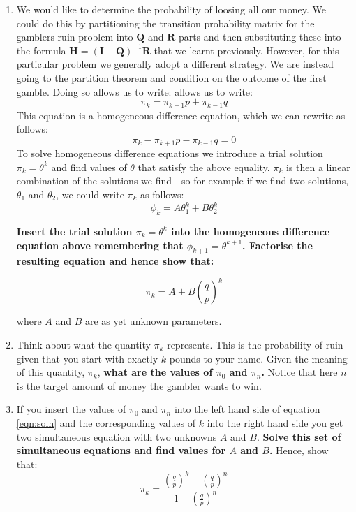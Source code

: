 \documentclass[a4paper]{article}
\begin{document}
\begin{enumerate}
\item We would like to determine the probability of loosing all our money.  We could do this by partitioning the transition probability matrix for the gamblers ruin problem into $\mathbf{Q}$ and
$\mathbf{R}$ parts and then substituting these into the formula $\mathbf{H} = (\mathbf{I} - \mathbf{Q})^{-1} \mathbf{R}$ that we learnt previously.  However, for this particular problem we generally
adopt a different strategy.  We are instead going to the partition theorem and condition on the outcome of the first gamble.  Doing so allows us to write:
allows us to write:
\[
 \pi_k = \pi_{k+1}p + \pi_{k-1}q
\]
This equation is a homogeneous difference equation, which we can rewrite as follows:
\[
\pi_k - \pi_{k+1}p - \pi_{k-1}q = 0
\]
To solve homogeneous difference equations we introduce a trial solution $\pi_k = \theta^k$ and find values of $\theta$ that satisfy the above equality.  $\pi_k$ is then a linear combination of the
solutions we find - so for example if we find two solutions, $\theta_1$ and $\theta_2$, we could write $\pi_k$ as follows:
\[
 \phi_k = A \theta_1^k + B \theta_2^k
\]
{\bf Insert the trial solution $\pi_k = \theta^k$ into the homogeneous difference equation above remembering that $\phi_{k+1}=\theta^{k+1}$.  Factorise the resulting equation and hence show that:

\begin{equation}
 \pi_k = A + B \left( \frac{q}{p}\right)^k
\label{eqn:soln}
\end{equation}

where $A$ and $B$ are as yet unknown parameters.}

\item Think about what the quantity $\pi_k$ represents.  This is the probability of ruin given that you start with exactly $k$ pounds to your name.  Given the meaning of this quantity, $\pi_k$, {\bf
what are the values of $\pi_0$ and $\pi_n$.}  Notice that here $n$ is the target amount of money the gambler wants to win.

\item If you insert the values of $\pi_0$ and $\pi_n$ into the left hand side of equation \ref{eqn:soln} and the corresponding values of $k$ into the right hand side you get two simultaneous
equation with two unknowns $A$ and $B$.  {\bf Solve this set of simultaneous equations and find values for $A$ and $B$.}  Hence, show that:
\[
 \pi_k = \frac{ \left( \frac{q}{p} \right)^k - \left( \frac{q}{p} \right)^n }{ 1 - \left( \frac{q}{p} \right)^n }
\]


\end{enumerate}
\end{document}
